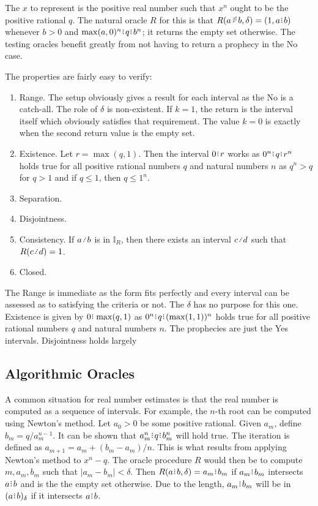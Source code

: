 \documentclass[12pt]{article}
\begin{document}
The $x$ to represent is the positive real number such that $x^n$ ought to be the positive rational $q$. The natural oracle $R$ for this is that $R(a\lt b, \delta) = (1, a\rint b)$ whenever $b > 0$ and $\max(a, 0)^n\rint q\rint b^n$; it returns the empty set otherwise. The testing oracles benefit greatly from not having to return a prophecy in the No case. 

The properties are fairly easy to verify:

\begin{enumerate}
\item Range. The setup obviously gives a result for each interval as the No is a catch-all. The role of $\delta$ is non-existent. If $k=1$, the return is the interval itself which obviously satisfies that requirement. The value $k=0$ is exactly when the second return value is the empty set. 

\item Existence. Let $r = \max(q,1)$. Then the interval $0\rint r$ works  as $0^n \rint  q \rint  r^n$ holds true for all positive rational numbers $q$ and natural numbers $n$ as $q^n > q$ for $q > 1$ and if $q\leq 1$, then $q \leq 1^n$.

\item Separation. 

\item Disjointness.

\item Consistency. If $a \lte b$ is in $\mathbb{I}_R$, then there exists an interval $c \lte d$ such that $R(c \lte d) = 1$.  

\item Closed. 

\end{enumerate}

The Range is immediate as the form fits perfectly and every interval can be assessed as to satisfying the criteria or not. The $\delta$ has no purpose for this one. Existence is given by $0\rint \max(q, 1)$ as $0^n \rint  q \rint  (\max(1, 1))^n$ holds true for all positive rational numbers $q$ and natural numbers $n$. The prophecies are just the Yes intervals. Disjointness holds largely 


\subsection{Algorithmic Oracles}


A common situation for real number estimates is that the real number is computed as a sequence of intervals. For example, the $n$-th root can be computed using Newton's method. Let $a_0 >0$ be some positive rational. Given $a_m$, define $b_m = q/a_m^{n-1}$. It can be shown that $a_m^n \rint  q \rint  b_m^n$ will hold true. The iteration is defined as $a_{m+1} = a_m + (b_m - a_m)/n$. This is what results from applying Newton's method to $x^n - q$. The oracle procedure $R$ would then be to compute $m, a_m, b_m$ such that $|a_m - b_m| < \delta$.  Then $R(a\rint b, \delta) = a_m\rint b_m$ if $a_m\rint b_m$ intersects $a\rint b$ and is the the empty set otherwise. Due to the length, $a_m\rint b_m$ will be in $\halo{a\rint b}$ if it intersects $a\rint b$. 
\end{document}
